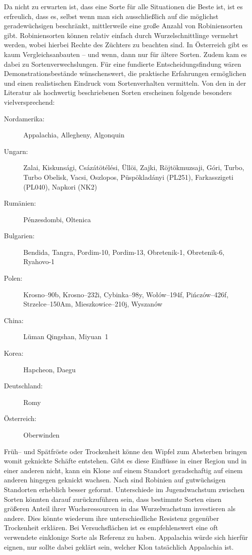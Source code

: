 \documentclass[twocolumn]{scrartcl}
\begin{document}
Da nicht zu erwarten ist, dass eine Sorte für alle Situationen die
Beste ist, ist es erfreulich, dass es, selbst wenn man sich
ausschließlich auf die möglichst geradewüchsigen beschränkt, mittlerweile eine
große Anzahl von Robiniensorten gibt. Robiniensorten können relativ
einfach durch Wurzelschnittlinge vermehrt werden, wobei hierbei Rechte
des Züchters zu beachten sind.
In Österreich gibt es kaum Vergleichsanbauten -- und wenn, dann nur für ältere Sorten.
Zudem kam es dabei zu Sortenverwechslungen.
Für eine fundierte Entscheidungsfindung wären Demonstrationsbestände wünschenswert,
die praktische Erfahrungen ermöglichen und einen realistischen Eindruck vom Sortenverhalten vermitteln.
Von den in der Literatur als hochwertig beschriebenen Sorten erscheinen folgende besonders vielversprechend:

\begin{description}
  \item[Nordamerika:] Appalachia, Allegheny, Algonquin
  \item[Ungarn:] Zalai, Kiskunsági, Csázátötélési, Üllöi, Zajki, Röjtökmuzsaji, Góri, Turbo, Turbo Obelisk, Vacsi, Oszlopos, Püspökladányi (PL251), Farkasszigeti (PL040), Napkori (NK2)
  \item[Rumänien:] Pénzesdombi, Oltenica
  \item[Bulgarien:] Bendida, Tangra, Pordim-10, Pordim-13, Obretenik-1, Obretenik-6, Ryahovo-1
  \item[Polen:]  Krosno--90b, Krosno--232i, Cybinka--98y, Wołów--194f, Pińczów--426f, Strzelce--150Am, Mieszkowice--210j, Wyszanów
  \item[China:] Lüman Qingshan, Miyuan~1
  \item[Korea:] Hapcheon, Daegu
  \item[Deutschland:] Romy
  \item[Österreich:] Oberwinden
\end{description}

Früh-- und Spätfröste oder Trockenheit könne den Wipfel zum Absterben
bringen womit geknickte Schäfte entstehen. Gibt es diese Einflüsse in
einer Region und in einer anderen nicht, kann ein Klone auf einem
Standort geradschaftig auf einem anderen hingegen geknickt wachsen.
Nach \citet[S.~48]{erteld1952robinieErtrag} sind Robinien auf
gutwüchsigen Standorten erheblich besser geformt.
Unterschiede im Jugendwachstum zwischen Sorten könnten darauf
zurückzuführen sein, dass bestimmte Sorten einen größeren Anteil ihrer
Wuchsressourcen in das Wurzelwachstum investieren als andere. Dies
könnte wiederum ihre unterschiedliche Resistenz gegenüber Trockenheit
erklären.
Bei Versuchsflächen ist es empfehlenswert eine oft verwendete einklonige
Sorte als Referenz zu haben. Appalachia würde sich hierfür eignen, nur
sollte dabei geklärt sein, welcher Klon tatsächlich Appalachia ist.
\end{document}
